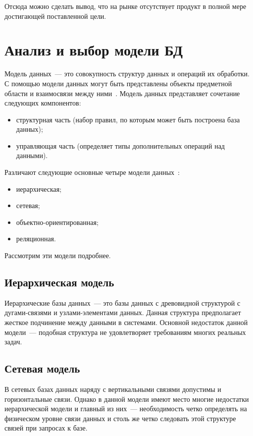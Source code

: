 Отсюда можно сделать вывод, что на рынке отсутствует продукт в полной мере достигающей поставленной цели.

\section{Анализ и выбор модели БД}%
\label{sec:analiz_i_vybor_modeli_bd}

Модель данных~--- это совокупность структур данных и операций их обработки. С помощью модели данных могут быть представлены объекты предметной области и взаимосвязи между ними~\cite{db}. Модель данных представляет сочетание следующих компонентов:
\begin{itemize}
    \item структурная часть (набор правил, по которым может быть построена база данных);
    \item управляющая часть (определяет типы дополнительных операций над данными).
\end{itemize}

Различают следующие основные четыре модели данных~\cite{db}:
\begin{itemize}
    \item иерархическая;
    \item сетевая;
    \item объектно-ориентированная;
    \item реляционная.
\end{itemize}

Рассмотрим эти модели подробнее.

\subsection{Иерархическая модель}%
\label{sub:ierarkhicheskaia_model_}

Иерархические базы данных~--- это базы данных с древовидной структурой с дугами-связями и узлами-элементами данных. Данная структура предполагает жесткое подчинение между данными в системами. Основной недостаток данной модели~--- подобная структура не удовлетворяет требованиям многих реальных задач.

\subsection{Сетевая модель}%
\label{sub:setevaia_model_}

В сетевых базах данных наряду с вертикальными связями допустимы и горизонтальные связи. Однако в данной модели имеют место многие недостатки иерархической модели и главный из них~--- необходимость четко определять на физическом уровне связи данных и столь же четко следовать этой структуре связей при запросах к базе.

